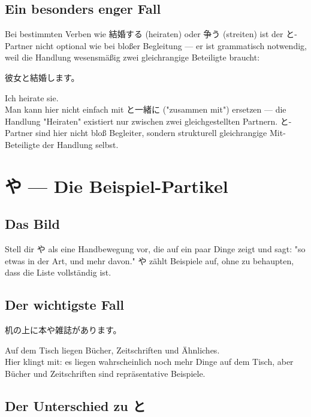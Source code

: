 \documentclass[12pt]{book}
\begin{document}
\section*{Ein besonders enger Fall}

Bei bestimmten Verben wie 結婚する (heiraten) oder 争う (streiten) ist der と-Partner nicht optional wie bei bloßer Begleitung — er ist grammatisch notwendig, weil die Handlung wesensmäßig zwei gleichrangige Beteiligte braucht:

\par\quad 彼女と結婚します。\\
\par\quad Ich heirate sie.\\

Man kann hier nicht einfach mit と一緒に ("zusammen mit") ersetzen — die Handlung "Heiraten" existiert nur zwischen zwei gleichgestellten Partnern. と-Partner sind hier nicht bloß Begleiter, sondern strukturell gleichrangige Mit-Beteiligte der Handlung selbst.


\chapter{や — Die Beispiel-Partikel}

\section*{Das Bild}

Stell dir や als eine Handbewegung vor, die auf ein paar Dinge zeigt und sagt: "so etwas in der Art, und mehr davon." や zählt Beispiele auf, ohne zu behaupten, dass die Liste vollständig ist.

\section*{Der wichtigste Fall}

\par\quad 机の上に本や雑誌があります。\\
\par\quad Auf dem Tisch liegen Bücher, Zeitschriften und Ähnliches.\\

Hier klingt mit: es liegen wahrscheinlich noch mehr Dinge auf dem Tisch, aber Bücher und Zeitschriften sind repräsentative Beispiele.

\section*{Der Unterschied zu と}
\end{document}
